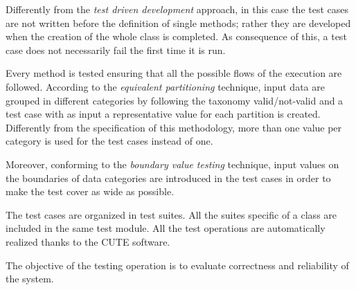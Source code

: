 	Differently from the \emph{test driven development} approach, in this case the test cases are not written before the definition of single methods; rather they are developed when the creation of the whole class is completed.
	As consequence of this, a test case does not necessarily fail the first time it is run. 
	
	Every method is tested ensuring that all the possible flows of the execution are followed.
	According to the \emph{equivalent partitioning} technique, input data are grouped in different categories by following the taxonomy valid/not-valid and a test case with as input a representative value for each partition is created. 
	Differently from the specification of this methodology, more than one value per category is used for the test cases instead of one.

	Moreover, conforming to the \emph{boundary value testing} technique, input values on the boundaries of data categories are introduced in the test cases in order to make the test cover as wide as possible. 

	The test cases are organized in test suites. All the suites specific of a class are included in the same test module. 
	All the test operations are automatically realized thanks to the CUTE software.

	The objective of the testing operation is to evaluate correctness and reliability of the system.



